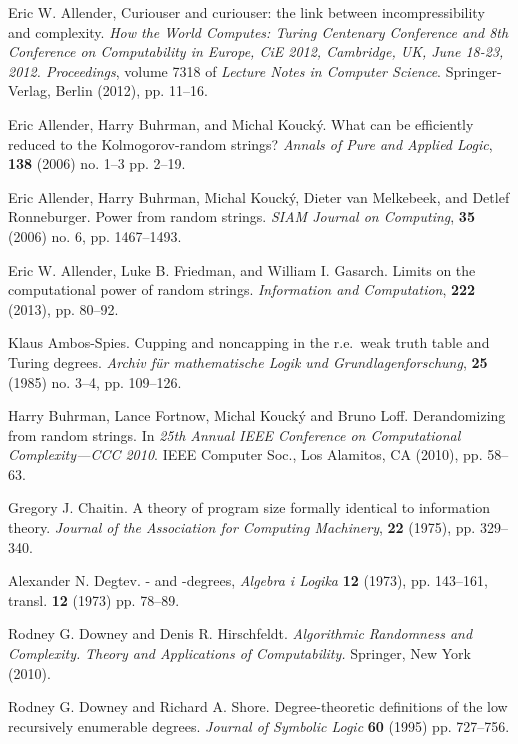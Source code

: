 \documentclass{LMCS}
\newcommand{\0}{\mathbf{0}}
\newcommand{\<}{\langle}
\renewcommand{\>}{\rangle}
\begin{document}
\begin{thebibliography}{99}

  Eric W. Allender,
  Curiouser and curiouser: the link between incompressibility and complexity.
  {\em How the World Computes: Turing Centenary Conference and
  8th Conference on Computability in Europe, CiE 2012, Cambridge,
  UK, June 18-23, 2012. Proceedings},
  volume 7318 of {\em Lecture Notes in Computer Science}.
  Springer-Verlag, Berlin (2012), pp. 11--16.

  Eric Allender, Harry Buhrman, and Michal Kouck{\'y}.
  What can be efficiently reduced to the {K}olmogorov-random strings?
  {\em Annals of Pure and Applied Logic}, {\bf 138} (2006) no. 1--3 pp. 2--19.

  Eric Allender, Harry Buhrman, Michal Kouck{\'y}, Dieter van Melkebeek, and
  Detlef Ronneburger.
  Power from random strings.
  {\em SIAM Journal on Computing}, {\bf 35} (2006) no. 6, pp. 1467--1493.

  Eric W. Allender, Luke B. Friedman, and William I. Gasarch.
  Limits on the computational power of random strings.
  {\em Information and Computation}, {\bf 222} (2013), pp. 80--92.

  Klaus Ambos-Spies.
  Cupping and noncapping in the r.e.\ weak truth table and Turing degrees.
  {\em Archiv f\"ur mathematische Logik und Grundlagenforschung},
  {\bf 25} (1985) no. 3--4, pp. 109--126.

  Harry Buhrman, Lance Fortnow, Michal Kouck{\'y} and Bruno Loff.
  Derandomizing from random strings.
  In {\em 25th {A}nnual {IEEE} {C}onference on {C}omputational
  {C}omplexity---{CCC} 2010}. IEEE Computer Soc., Los Alamitos,
  CA (2010), pp. 58--63.

  Gregory J. Chaitin.
  A theory of program size formally identical to information theory.
  {\em Journal of the Association for Computing Machinery},
  {\bf 22} (1975), pp. 329--340.

  Alexander N. Degtev.
  - and -degrees,
  {\em Algebra i Logika} {\bf 12} (1973), pp. 143--161,
  transl. {\bf 12} (1973) pp. 78--89.

  Rodney G. Downey and Denis R. Hirschfeldt.
  {\em Algorithmic Randomness and Complexity.}
  {\em Theory and Applications of Computability.}
  Springer, New York (2010).

  Rodney G. Downey and Richard A. Shore.
  Degree-theoretic definitions of the low recursively enumerable degrees.
  {\em Journal of Symbolic Logic} {\bf 60} (1995) pp. 727--756.


\end{thebibliography}
\end{document}
